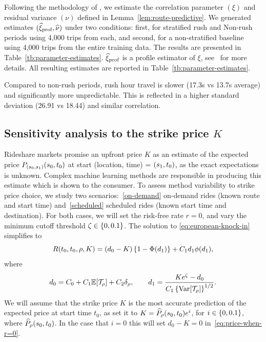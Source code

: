 \documentclass[12pt]{article}
\begin{document}
{{{{{{Following the methodology of \cite{elmasri2020predictive}, we estimate the correlation parameter $(\xi)$ and residual variance $(\nu)$ defined in Lemma~\ref{lem:route-predictive}. We generated estimates $({\widehat{\xi}_\text{prof}}, {\widehat \nu})$ under two conditions: first, for stratified rush and Non-rush periods using 4,000 trips from each, and second, for a non-stratified baseline using 4,000 trips from the entire training data. The results are presented in Table~\ref{tb:parameter-estimates}. ${\widehat{\xi}_\text{prof}}$ is a profile estimator of $\xi$, see~\citet[Sec.~3.4]{elmasri2020predictive} for more details. All resulting estimates are reported in Table~\ref{tb:parameter-estimates}.

Compared to non-rush periods, rush hour travel is slower (17.3s vs 13.7s average) and significantly more unpredictable. This is reflected in a higher standard deviation (26.91 vs 18.44) and similar correlation.

\subsection{Sensitivity analysis to the strike price $K$}\label{sec:Sensitivity analysis to the strike price}
Rideshare markets promise an upfront price $K$ as an estimate of the expected price $P_{\left({s_0}, { s_1}\right)}({s_0}, t_0)$ at start (location, time) = $({ s_1}, t_0)$, as the exact expectations is unknown. Complex machine learning methods are responsible in producing this estimate which is shown to the consumer. To assess method variability to strike price choice, we study two scenarios:~\ref{on-demand} on-demand rides (known route and start time) and~\ref{scheduled} scheduled rides (known start time and destination). For both cases, we will set the risk-free rate $r=0$, and vary the minimum cutoff threshold $\zeta \in \left\{0, 0.1\right\}$. The solution to \eqref{eq:european-knock-in} simplifies to 
\begin{equation}\label{eq:price-when-r=0}
R(t_0,t_0, \rho, K) = (d_0-K)\left\{1- \Phi(d_1)\right\} + C_1d_1\phi(d_1),
\end{equation} 
where 
\[
d_0 = C_0 + C_1\mathbb{E}[\mathcal{T}_\rho] + C_2\delta_\rho, \qquad
d_1 = \frac{Ke^\zeta -d_0}{C_1\left\{\operatorname{{\rm Var}}[\mathcal{T}_\rho]\right\}^{1/2}}.
\]
We will assume that the strike price $K$ is the most accurate prediction of the expected price at start time $t_0$, as set it to $K = \widehat P_\rho({s_0}, t_0)e^{i}$, for $i \in \left\{0, 0.1\right\}$, where $\widehat P_\rho({s_0}, t_0)$. In the case that $i= 0$ this will set $d_0 - K=0$ in~\eqref{eq:price-when-r=0}. 
    
}}}}}}
\end{document}
